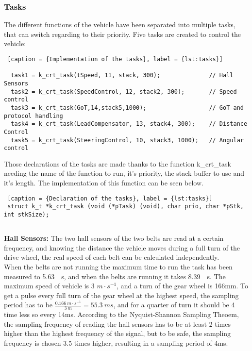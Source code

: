 \subsubsection{Tasks}
The different functions of the vehicle have been separated into multiple tasks, that can switch regarding to their priority. Five tasks are created to control the vehicle:

\begin{lstlisting} [caption = {Implementation of the tasks}, label = {lst:tasks}]

  task1 = k_crt_task(tSpeed, 11, stack, 300);         	   // Hall Sensors
  task2 = k_crt_task(SpeedControl, 12, stack2, 300); 	   // Speed control
  task3 = k_crt_task(GoT,14,stack5,1000);        		   // GoT and protocol handling
  task4 = k_crt_task(LeadCompensator, 13, stack4, 300);    // Distance Control
  task5 = k_crt_task(SteeringControl, 10, stack3, 1000);   // Angular control

\end{lstlisting}

Those declarations of the tasks are made thanks to the function k\_crt\_task needing the name of the function to run, it's priority, the stack buffer to use and it's length. The implementation of this function can be seen below.


\begin{lstlisting} [caption = {Declaration of the tasks}, label = {lst:tasks}]
 struct k_t *k_crt_task (void (*pTask) (void), char prio, char *pStk, int stkSize);
 
\end{lstlisting}


\textbf{Hall Sensors:}
The two hall sensors of the two belts are read at a certain frequency, and knowing the distance the vehicle moves during a full turn of the drive wheel, the real speed of each belt can be calculated independently.\\
When the belts are not running the maximum time to run the task has been measured to \SI{5.63}{\mu s}, and when the belts are running it takes \SI{8.39}{\mu s}.
The maximum speed of vehicle is 3 $m \cdot s^{-1}$, and a turn of the gear wheel is 166mm. To get a pulse every full turn of the gear wheel at the highest speed, the sampling period has to be $\frac{\SI{0.166}{m\cdot s^{-1}}}{\SI{3}{m}}={\SI{55.3}{ms}}$, and for a quarter of turn it should be 4 time less so every 14ms. According to the Nyquist-Shannon Sampling Theoem, the sampling frequency of reading the hall sensors has to be at least 2 times higher than the highest frequency of the signal, but to be safe, the sampling frequency is chosen \SI{3.5}{} times higher, resulting in a sampling period of 4ms.

